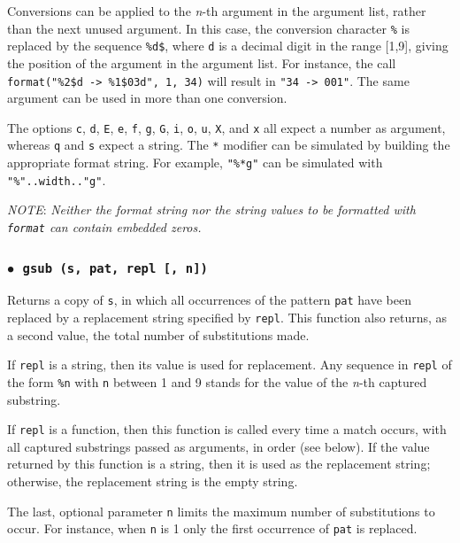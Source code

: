 \documentclass[11pt]{article}
\newcommand{\M}[1]{\rm\emph{#1}}
\newcommand{\T}[1]{{\tt #1}}
\newcommand{\Deffunc}[1]{\index{#1}}
\newcommand{\ff}{$\bullet$\ }
\newcommand{\NOTE}{\par\noindent\emph{NOTE}: }
\begin{document}
Conversions can be applied to the \M{n}-th argument in the argument list,
rather than the next unused argument.
In this case, the conversion character \verb|%| is replaced
by the sequence \verb|%d$|, where \verb|d| is a
decimal digit in the range [1,9],
giving the position of the argument in the argument list.
For instance, the call \verb|format("%2$d -> %1$03d", 1, 34)| will
result in \verb|"34 -> 001"|.
The same argument can be used in more than one conversion.

The options \verb|c|, \verb|d|, \verb|E|, \verb|e|, \verb|f|,
\verb|g|, \verb|G|, \verb|i|, \verb|o|, \verb|u|, \verb|X|, and \verb|x| all
expect a number as argument,
whereas \verb|q| and \verb|s| expect a string.
The \verb|*| modifier can be simulated by building
the appropriate format string.
For example, \verb|"%*g"| can be simulated with
\verb|"%"..width.."g"|.

\NOTE
\emph{Neither the format string nor the string values to be formatted with
\T{format} can contain embedded zeros.}

\subsubsection*{\ff \T{gsub (s, pat, repl [, n])}}
\Deffunc{gsub}
Returns a copy of \verb|s|,
in which all occurrences of the pattern \verb|pat| have been
replaced by a replacement string specified by \verb|repl|.
This function also returns, as a second value,
the total number of substitutions made.

If \verb|repl| is a string, then its value is used for replacement.
Any sequence in \verb|repl| of the form \verb|%n|
with \verb|n| between 1 and 9
stands for the value of the \M{n}-th captured substring.

If \verb|repl| is a function, then this function is called every time a
match occurs, with all captured substrings passed as arguments,
in order (see below).
If the value returned by this function is a string,
then it is used as the replacement string;
otherwise, the replacement string is the empty string.

The last, optional parameter \verb|n| limits
the maximum number of substitutions to occur.
For instance, when \verb|n| is 1 only the first occurrence of
\verb|pat| is replaced.
\end{document}

